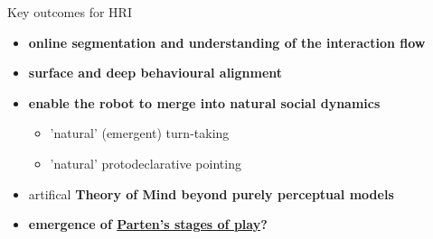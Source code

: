 \documentclass[xcolor=table]{beamer}
\begin{document}
\begin{frame}{Key outcomes for HRI}

    \begin{itemize}

        \item {\bf online segmentation and understanding of the interaction
            flow}

        \item {\bf surface and deep behavioural alignment}


        \item {\bf enable the robot to merge into natural social dynamics}
            \begin{itemize}
                \item 'natural' (\ie emergent) turn-taking
                \item 'natural' protodeclarative pointing
            \end{itemize}

    \end{itemize}

    \pause
    \begin{itemize}
        \item artifical {\bf Theory of Mind beyond purely perceptual models}

        \item {\bf emergence of \hyperlink{parten}{Parten's stages of
            play}?}


    \end{itemize}

\end{frame}
\end{document}
